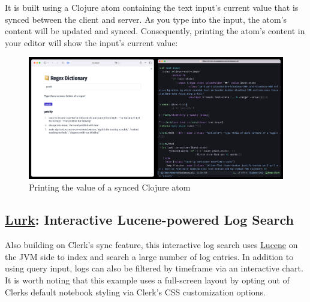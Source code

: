 \documentclass[sigconf,screen]{acmart}
\begin{document}
It is built using a Clojure atom containing the text input's current value that is synced between the client and server. As you type into the input, the atom's content will be updated and synced. Consequently, printing the atom's content in your editor will show the input's current value:

\begin{figure}
\hypertarget{printing-the-value-of-a-synced-clojure-atom}{%
\centering
\includegraphics{images/printing-the-value-of-a-synced-clojure-atom.png}
\caption{Printing the value of a synced Clojure atom}\label{printing-the-value-of-a-synced-clojure-atom}
}
\end{figure}

\hypertarget{lurk:-interactive-lucene-powered-log-search}{%
\subsection{\texorpdfstring{\href{https://github.com/nextjournal/lurk}{Lurk}: Interactive Lucene-powered Log Search}{Lurk: Interactive Lucene-powered Log Search}}\label{lurk:-interactive-lucene-powered-log-search}}

Also building on Clerk's sync feature, this interactive log search uses \href{https://lucene.apache.org/}{Lucene} on the JVM side to index and search a large number of log entries. In addition to using query input, logs can also be filtered by timeframe via an interactive chart. It is worth noting that this example uses a full-screen layout by opting out of Clerk\textquotesingle s default notebook styling via Clerk's CSS customization options.
\end{document}
